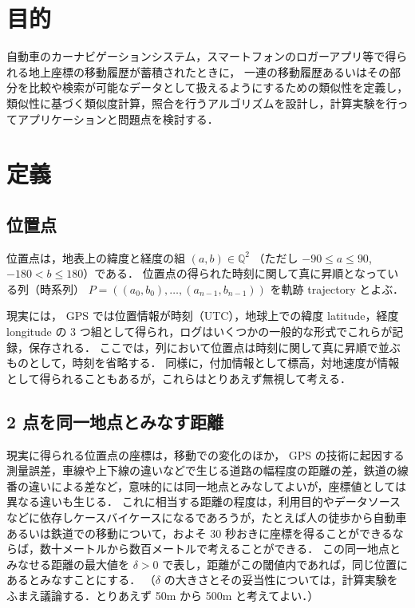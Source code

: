 \documentclass[11pt]{jarticle}
\begin{document}
\section{目的}

自動車のカーナビゲーションシステム，スマートフォンのロガーアプリ等で得られる地上座標の移動履歴が蓄積されたときに，
一連の移動履歴あるいはその部分を比較や検索が可能なデータとして扱えるようにするための類似性を定義し，
類似性に基づく類似度計算，照合を行うアルゴリズムを設計し，計算実験を行ってアプリケーションと問題点を検討する．

\section{定義}

\subsection{位置点}
位置点は，地表上の緯度と経度の組 $(a, b) \in \mathbb{Q}^2$ （ただし $-90 \leq a \leq 90$, $-180 < b \leq 180$）である．
位置点の得られた時刻に関して真に昇順となっている列（時系列） $P = ((a_0, b_0), \ldots,(a_{n-1}, b_{n-1}))$ を軌跡 trajectory とよぶ．

現実には，
GPS では位置情報が時刻（UTC），地球上での緯度 latitude，経度 longitude の 3 つ組として得られ，ログはいくつかの一般的な形式でこれらが記録，保存される．
ここでは，列において位置点は時刻に関して真に昇順で並ぶものとして，時刻を省略する．
同様に，付加情報として標高，対地速度が情報として得られることもあるが，これらはとりあえず無視して考える．

\subsection{2 点を同一地点とみなす距離}
現実に得られる位置点の座標は，移動での変化のほか，
GPS の技術に起因する測量誤差，車線や上下線の違いなどで生じる道路の幅程度の距離の差，鉄道の線番の違いによる差など，意味的には同一地点とみなしてよいが，座標値としては異なる違いも生じる．
これに相当する距離の程度は，利用目的やデータソースなどに依存しケースバイケースになるであろうが，たとえば人の徒歩から自動車あるいは鉄道での移動について，およそ 30 秒おきに座標を得ることができるならば，数十メートルから数百メートルで考えることができる．
この同一地点とみなせる距離の最大値を $\delta > 0$ で表し，距離がこの閾値内であれば，同じ位置にあるとみなすことにする．
（$\delta$ の大きさとその妥当性については，計算実験をふまえ議論する．とりあえず 50m から 500m と考えてよい．）
\end{document}
